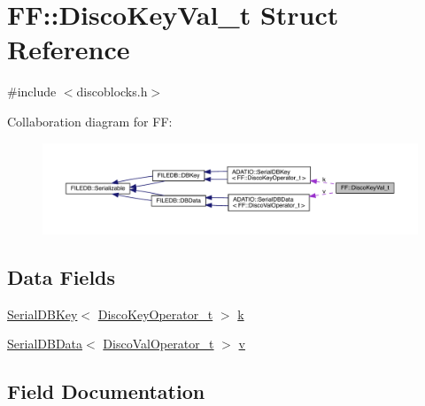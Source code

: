 \hypertarget{structFF_1_1DiscoKeyVal__t}{}\section{FF\+:\+:Disco\+Key\+Val\+\_\+t Struct Reference}
\label{structFF_1_1DiscoKeyVal__t}


{\ttfamily \#include $<$discoblocks.\+h$>$}



Collaboration diagram for FF\+:\nopagebreak
\begin{figure}[H]
\begin{center}
\leavevmode
\includegraphics[width=350pt]{d3/ded/structFF_1_1DiscoKeyVal__t__coll__graph}
\end{center}
\end{figure}
\subsection*{Data Fields}
\begin{DoxyCompactItemize}
\item 
\mbox{\hyperlink{classADATIO_1_1SerialDBKey}{Serial\+D\+B\+Key}}$<$ \mbox{\hyperlink{structFF_1_1DiscoKeyOperator__t}{Disco\+Key\+Operator\+\_\+t}} $>$ \mbox{\hyperlink{structFF_1_1DiscoKeyVal__t_ae885692987726bc675c54c905d3ac948}{k}}
\item 
\mbox{\hyperlink{classADATIO_1_1SerialDBData}{Serial\+D\+B\+Data}}$<$ \mbox{\hyperlink{classFF_1_1DiscoValOperator__t}{Disco\+Val\+Operator\+\_\+t}} $>$ \mbox{\hyperlink{structFF_1_1DiscoKeyVal__t_ae0d9c7724d26fd2b0c5118b65651b443}{v}}
\end{DoxyCompactItemize}


\subsection{Field Documentation}
\mbox{\label{structFF_1_1DiscoKeyVal__t_ae885692987726bc675c54c905d3ac948}} 
